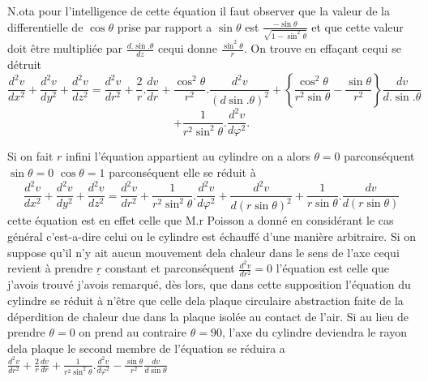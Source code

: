 \documentclass[11pt,a4paper]{article}
\begin{document}
N.ota pour l'intelligence de cette équation il faut observer que la
valeur de la differentielle de $\cos\theta$ prise par rapport a $\sin\theta$
est $\frac{-\sin\theta}{\sqrt{1-\sin^2\theta}}$ et que cette valeur doit être multipliée par
$\frac{d.\sin.\theta}{dz}$ cequi donne $\frac{\sin^2\theta}{r}$. On trouve en effaçant cequi se détruit
\[\frac{d^2v}{dx^2}+\frac{d^2v}{dy^2}+\frac{d^2v}{dz^2}=\frac{d^2v}{dr^2}+\frac{2}{r}.\frac{dv}{dr}+\frac{\cos^2\theta}{r^2}.\frac{d^2v}{(d\sin.\theta)^2}+\left\{\frac{\cos^2\theta}{r^2\sin\theta}-\frac{\sin\theta}{r^2}\right\}\frac{dv}{d.\sin.\theta}\]
\[+\frac{1}{r^2\sin^2\theta}.\frac{d^2v}{d\varphi^2}.\]

Si on fait $r$ infini l'équation appartient au cylindre on a alors
$\theta=0$ parconséquent $\sin\theta=0$ \quad $\cos\theta=1$ \quad parconséquent elle se réduit à
\[\frac{d^2v}{dx^2}+\frac{d^2v}{dy^2}+\frac{d^2v}{dz^2}=\frac{d^2v}{dr^2}+\frac{1}{r^2\sin^2\theta}.\frac{d^2v}{d\varphi^2}+\frac{d^2v}{d(r\sin\theta)^2}+\frac{1}{r\sin\theta}.\frac{dv}{d(r\sin\theta)}\]
cette équation est en effet celle que M.r Poisson a donné en considérant
le cas général c'est-a-dire celui ou le cylindre est échauffé d'une
manière arbitraire. Si on suppose qu'il n'y ait aucun mouvement
dela chaleur dans le sens de l'axe cequi revient à prendre $\underline{r}$ constant
et parconséquent $\frac{d^2v}{dr^2}=0$ l'équation est celle que j'avois trouvé
j'avois remarqué, dès lors, que dans cette supposition l'équation
du cylindre se réduit à n'être que celle dela plaque circulaire
abstraction faite de la déperdition de chaleur due dans la plaque isolée
au contact de l'air. Si au lieu de prendre $\theta=0$ on prend au contraire
$\theta=90$,  l'axe du cylindre deviendra le rayon dela plaque
le second membre de l'équation se réduira a $\frac{d^2v}{dr^2}+\frac{2}{r}\frac{dv}{dr}+\frac{1}{r^2\sin^2\theta}.\frac{d^2v}{d\varphi^2}-\frac{\sin\theta}{r^2}\frac{dv}{d\sin\theta}$
\end{document}
